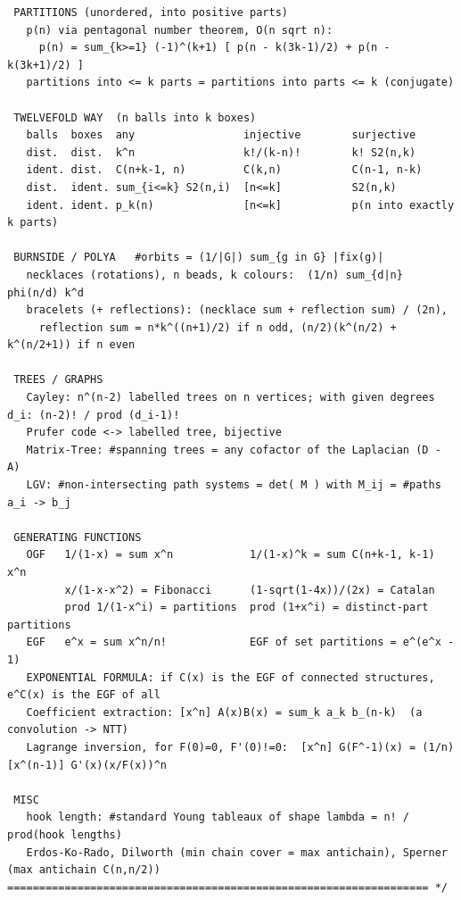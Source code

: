 \documentclass[9pt,a4paper,twocolumn]{extarticle}
\begin{document}
\begin{lstlisting}
 PARTITIONS (unordered, into positive parts)
   p(n) via pentagonal number theorem, O(n sqrt n):
     p(n) = sum_{k>=1} (-1)^(k+1) [ p(n - k(3k-1)/2) + p(n - k(3k+1)/2) ]
   partitions into <= k parts = partitions into parts <= k (conjugate)

 TWELVEFOLD WAY  (n balls into k boxes)
   balls  boxes  any                 injective        surjective
   dist.  dist.  k^n                 k!/(k-n)!        k! S2(n,k)
   ident. dist.  C(n+k-1, n)         C(k,n)           C(n-1, n-k)
   dist.  ident. sum_{i<=k} S2(n,i)  [n<=k]           S2(n,k)
   ident. ident. p_k(n)              [n<=k]           p(n into exactly k parts)

 BURNSIDE / POLYA   #orbits = (1/|G|) sum_{g in G} |fix(g)|
   necklaces (rotations), n beads, k colours:  (1/n) sum_{d|n} phi(n/d) k^d
   bracelets (+ reflections): (necklace sum + reflection sum) / (2n),
     reflection sum = n*k^((n+1)/2) if n odd, (n/2)(k^(n/2) + k^(n/2+1)) if n even

 TREES / GRAPHS
   Cayley: n^(n-2) labelled trees on n vertices; with given degrees d_i: (n-2)! / prod (d_i-1)!
   Prufer code <-> labelled tree, bijective
   Matrix-Tree: #spanning trees = any cofactor of the Laplacian (D - A)
   LGV: #non-intersecting path systems = det( M ) with M_ij = #paths a_i -> b_j

 GENERATING FUNCTIONS
   OGF   1/(1-x) = sum x^n            1/(1-x)^k = sum C(n+k-1, k-1) x^n
         x/(1-x-x^2) = Fibonacci      (1-sqrt(1-4x))/(2x) = Catalan
         prod 1/(1-x^i) = partitions  prod (1+x^i) = distinct-part partitions
   EGF   e^x = sum x^n/n!             EGF of set partitions = e^(e^x - 1)
   EXPONENTIAL FORMULA: if C(x) is the EGF of connected structures, e^C(x) is the EGF of all
   Coefficient extraction: [x^n] A(x)B(x) = sum_k a_k b_(n-k)  (a convolution -> NTT)
   Lagrange inversion, for F(0)=0, F'(0)!=0:  [x^n] G(F^-1)(x) = (1/n)[x^(n-1)] G'(x)(x/F(x))^n

 MISC
   hook length: #standard Young tableaux of shape lambda = n! / prod(hook lengths)
   Erdos-Ko-Rado, Dilworth (min chain cover = max antichain), Sperner (max antichain C(n,n/2))
================================================================== */
\end{lstlisting}

\filbreak
\end{document}
